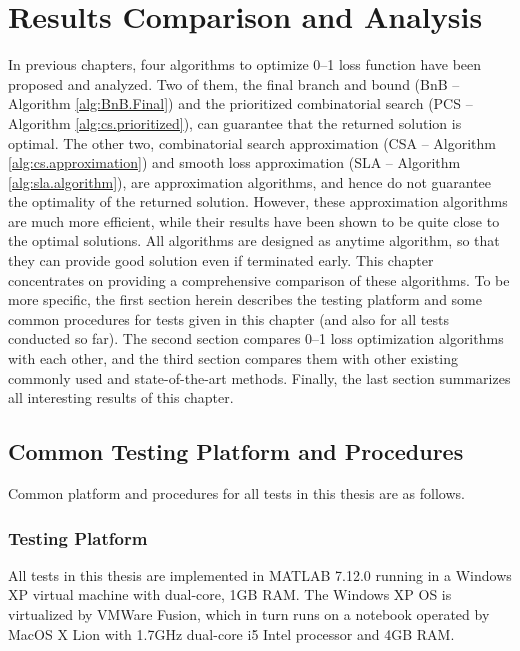 \section{Results Comparison and Analysis}
\label{cha:results}

In previous chapters, four algorithms to optimize 0--1 loss function have been proposed and analyzed. Two of them, the final branch and bound (BnB -- Algorithm \ref{alg:BnB.Final}) and the prioritized combinatorial search (PCS -- Algorithm \ref{alg:cs.prioritized}), can guarantee that the returned solution is optimal. The other two, combinatorial search approximation (CSA -- Algorithm \ref{alg:cs.approximation}) and smooth loss approximation (SLA -- Algorithm \ref{alg:sla.algorithm}), are approximation algorithms, and hence do not guarantee the optimality of the returned solution. However, these approximation algorithms are much more efficient, while their results have been shown to be quite close to the optimal solutions. All algorithms are designed as anytime algorithm, so that they can provide good solution even if terminated early. This chapter concentrates on providing a comprehensive comparison of these algorithms. To be more specific, the first section herein describes the testing platform and some common procedures for tests given in this chapter (and also for all tests conducted so far). The second section compares 0--1 loss optimization algorithms with each other, and  the third section compares them with other existing commonly used and state-of-the-art methods. Finally, the last section summarizes all interesting results of this chapter.


\subsection{Common Testing Platform and Procedures}
\label{sec:rc.method}

Common platform and procedures for all tests in this thesis are as follows. 

\subsubsection{Testing Platform}

All tests in this thesis are implemented in MATLAB 7.12.0 running in a Windows XP virtual machine with dual-core, 1GB RAM. The Windows XP OS is virtualized by VMWare Fusion, which in turn runs on a notebook operated by MacOS X Lion with 1.7GHz dual-core i5 Intel processor and 4GB RAM. 

